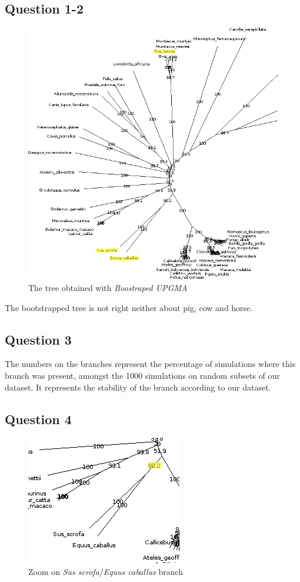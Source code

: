 \documentclass[]{article}
\theoremstyle{definition}
\begin{document}
\subsection{Question 1-2}

 \begin{figure}[H]
	\centering
	\includegraphics*[scale=0.3]{image/ex3qt2.png}
	\caption{ The tree obtained with \textit{Boostraped UPGMA} }
\end{figure}

The bootstrapped tree is not right neither about pig, cow and horse.

\subsection{Question 3}
The numbers on the branches represent the percentage of simulations where this  branch was present, amongst the 1000 simulations on random subsets of our dataset. It represents the stability of the branch according to our dataset.
\subsection{Question 4}

 \begin{figure}[H]
	\centering
	\includegraphics*[scale=0.8]{image/ex3qt4.png}
	\caption{ Zoom on   \textit{Sus scrofa}/\textit{Equus caballus} branch}
\end{figure}
\end{document}
